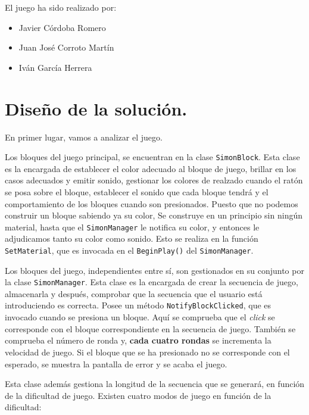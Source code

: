 \documentclass{article}
\begin{document}
El juego ha sido realizado por:

\begin{itemize}
\item Javier Córdoba Romero
\item Juan José Corroto Martín
\item Iván García Herrera
\end{itemize}

\section{Diseño de la solución.}

En primer lugar, vamos a analizar el juego.

Los bloques del juego principal, se encuentran en la clase \texttt{SimonBlock}. Esta clase es la encargada de establecer el color adecuado al bloque de juego, brillar en los casos adecuados y emitir sonido, gestionar los colores de realzado cuando el ratón se posa sobre el bloque, establecer el sonido que cada bloque tendrá y el comportamiento de los bloques cuando son presionados. Puesto que no podemos construir un bloque sabiendo ya su color, Se construye en un principio sin ningún material, hasta que el \texttt{SimonManager} le notifica su color, y entonces le adjudicamos tanto su color como sonido. Esto se realiza en la función \texttt{SetMaterial}, que es invocada en el  \texttt{BeginPlay()} del  \texttt{SimonManager}.

\vspace*{0.15in}

Los bloques del juego, independientes entre sí, son gestionados en su conjunto por la clase \texttt{SimonManager}. Esta clase es la encargada de crear la secuencia de juego, almacenarla y después, comprobar que la secuencia que el usuario está introduciendo es correcta. Posee un método \texttt{NotifyBlockClicked}, que es invocado cuando se presiona un bloque. Aquí se comprueba que el \textit{click} se corresponde con el bloque correspondiente en la secuencia de juego. También se comprueba el número de ronda y, \textbf{cada cuatro rondas} se incrementa la velocidad de juego. Si el bloque que se ha presionado no se corresponde con el esperado, se muestra
la pantalla de error y se acaba el juego. 

Esta clase además gestiona la longitud de la secuencia que se generará, en función de la dificultad de juego. Existen cuatro modos de juego en función de la dificultad:
\end{document}
